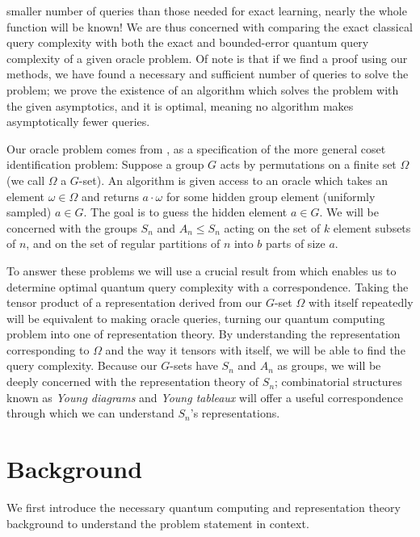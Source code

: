 \documentclass[12pt,twoside]{reedthesis}
\theoremstyle{plain}   %
\theoremstyle{definition}
\theoremstyle{remark}
\numberwithin{equation}{section}
\begin{document}
  smaller number of queries than those needed for exact learning, nearly the whole function will be known!
  We are thus concerned with comparing the exact classical query complexity with both the exact and bounded-error quantum query complexity of a given oracle problem.
  Of note is that if we find a proof using our methods, we have found a necessary and sufficient number of queries to solve the problem;
  we prove the existence of an algorithm which solves the problem with the given asymptotics, and it is optimal,
  meaning no algorithm makes asymptotically fewer queries.
  \par
  Our oracle problem comes from \cite{copeland}, as a specification of the more general coset identification problem:
  Suppose a group $G$ acts by permutations on a finite set $\Omega$ (we call $\Omega$ a $G$-set).
  An algorithm is given access to an oracle which takes an element $\omega \in \Omega$ and returns $a \cdot \omega$ for some hidden group element (uniformly sampled) $a \in G$. The goal is to guess
  the hidden element $a \in G$.
  We will be concerned with the groups $S_n$ and $A_n \leq S_n$ acting on the set of $k$ element subsets of $n$, and on the set of regular partitions of $n$ into $b$ parts of size $a$.
  \par
  To answer these problems we will use a crucial result from \cite{copeland} which enables us to determine optimal quantum query complexity with a correspondence.
  Taking the tensor product of a representation derived from our $G$-set $\Omega$ with itself repeatedly will be equivalent to making oracle queries, turning our quantum computing problem
  into one of representation theory.
  By understanding the representation corresponding to $\Omega$ and the way it tensors with itself, we will be able to find the query complexity.
  Because our $G$-sets have $S_n$ and $A_n$ as groups, we will be deeply concerned with the representation theory of $S_n$;
  combinatorial structures known as \emph{Young diagrams} and \emph{Young tableaux} will offer a useful correspondence through which we can understand $S_n$'s representations.
  
  
  \chapter{Background}
  We first introduce the necessary quantum computing and representation theory background to understand the problem statement in context.
\end{document}
